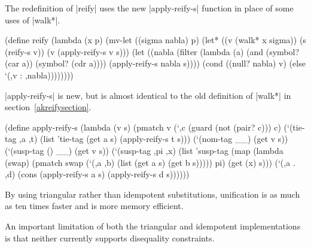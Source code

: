 The redefinition of \scheme|reify| uses the new \scheme|apply-reify-s|
function in place of some uses of \scheme|walk*|.

\schemedisplayspace
\begin{schemedisplay}
(define reify
  (lambda (x p)
    (mv-let ((sigma nabla) p)
      (let* ((v (walk* x sigma)) (s (reify-s v)) (v (apply-reify-s v s)))
        (let ((nabla (filter (lambda (a) (and (symbol? (car a)) (symbol? (cdr a))))
                       (apply-reify-s nabla s))))
          (cond
            ((null? nabla) v)
            (else `(,v : ,nabla))))))))
\end{schemedisplay}

\newpage

\scheme|apply-reify-s| is new, but is almost identical to the old
definition of \scheme|walk*| in section~\ref{akreifysection}.

\schemedisplayspace
\begin{schemedisplay}
(define apply-reify-s
  (lambda (v s)
    (pmatch v
      (`,c (guard (not (pair? c))) c)
      (`(tie-tag ,a ,t) (list 'tie-tag (get a s) (apply-reify-s t s)))
      (`(nom-tag __) (get v s))
      (`(susp-tag () __) (get v s))
      (`(susp-tag ,pi ,x) 
       (list 'susp-tag
         (map (lambda (swap)
                (pmatch swap
                  (`(,a ,b) (list (get a s) (get b s)))))
              pi)
         (get (x) s)))
      (`(,a . ,d) (cons (apply-reify-s a s) (apply-reify-s d s))))))
\end{schemedisplay}

By using triangular rather than idempotent substitutions, unification
is as much as ten times faster and is more memory efficient.

An important limitation of both the triangular and idempotent
implementations is that neither currently supports disequality
constraints.




